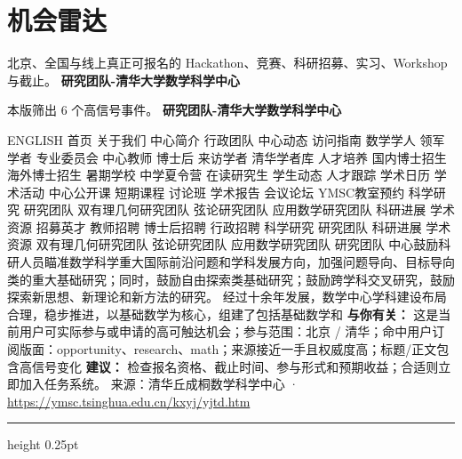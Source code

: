 \documentclass[10.5pt]{ctexart}
\begin{document}
\section*{机会雷达}
{\color{ormuted} 北京、全国与线上真正可报名的 Hackathon、竞赛、科研招募、实习、Workshop 与截止。}
\vspace{2mm}
{\LARGE\bfseries 研究团队-清华大学数学科学中心}\par
\vspace{1mm}
{\color{ormuted} 本版筛出 6 个高信号事件。}
\vspace{3mm}
{\Large\bfseries 研究团队-清华大学数学科学中心}\par
ENGLISH 首页 关于我们 中心简介 行政团队 中心动态 访问指南 数学学人 领军学者 专业委员会 中心教师 博士后 来访学者 清华学者库 人才培养 国内博士招生 海外博士招生 暑期学校 中学夏令营 在读研究生 学生动态 人才跟踪 学术日历 学术活动 中心公开课 短期课程 讨论班 学术报告 会议论坛 YMSC教室预约 科学研究 研究团队 双有理几何研究团队 弦论研究团队 应用数学研究团队 科研进展 学术资源 招募英才 教师招聘 博士后招聘 行政招聘 科学研究 研究团队 科研进展 学术资源 双有理几何研究团队 弦论研究团队 应用数学研究团队 研究团队 中心鼓励科研人员瞄准数学科学重大国际前沿问题和学科发展方向，加强问题导向、目标导向类的重大基础研究；同时，鼓励自由探索类基础研究；鼓励跨学科交叉研究，鼓励探索新思想、新理论和新方法的研究。 经过十余年发展，数学中心学科建设布局合理，稳步推进，以基础数学为核心，组建了包括基础数学和
\textbf{与你有关：} 这是当前用户可实际参与或申请的高可触达机会；参与范围：北京 / 清华；命中用户订阅版面：opportunity、research、math；来源接近一手且权威度高；标题/正文包含高信号变化
\textbf{建议：} 检查报名资格、截止时间、参与形式和预期收益；合适则立即加入任务系统。
{\footnotesize\color{ormuted} 来源：清华丘成桐数学科学中心 · \url{https://ymsc.tsinghua.edu.cn/kxyj/yjtd.htm}}
\vspace{4mm}
\hrule height 0.25pt
\vspace{3mm}
\end{document}
